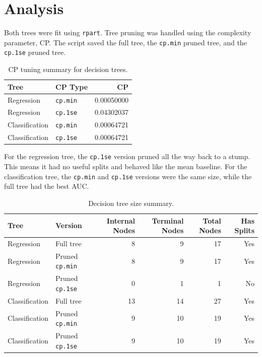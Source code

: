 \documentclass[11pt,oneside,openany]{book}
\begin{document}
\section{Analysis}

Both trees were fit using \texttt{rpart}. Tree pruning was handled using the complexity parameter, CP. The script saved the full tree, the \texttt{cp.min} pruned tree, and the \texttt{cp.1se} pruned tree.

\begin{table}[H]
\centering
\small
\caption{CP tuning summary for decision trees.}
\begin{tabular}{llr}
\toprule
Tree & CP Type & CP\\
\midrule
Regression & \texttt{cp.min} & 0.00050000\\
Regression & \texttt{cp.1se} & 0.04302037\\
Classification & \texttt{cp.min} & 0.00064721\\
Classification & \texttt{cp.1se} & 0.00064721\\
\bottomrule
\end{tabular}
\end{table}

For the regression tree, the \texttt{cp.1se} version pruned all the way back to a stump. This means it had no useful splits and behaved like the mean baseline. For the classification tree, the \texttt{cp.min} and \texttt{cp.1se} versions were the same size, while the full tree had the best AUC.

\begin{table}[H]
\centering
\small
\caption{Decision tree size summary.}
\begin{tabular}{llrrrr}
\toprule
Tree & Version & Internal Nodes & Terminal Nodes & Total Nodes & Has Splits\\
\midrule
Regression & Full tree & 8 & 9 & 17 & Yes\\
Regression & Pruned \texttt{cp.min} & 8 & 9 & 17 & Yes\\
Regression & Pruned \texttt{cp.1se} & 0 & 1 & 1 & No\\
Classification & Full tree & 13 & 14 & 27 & Yes\\
Classification & Pruned \texttt{cp.min} & 9 & 10 & 19 & Yes\\
Classification & Pruned \texttt{cp.1se} & 9 & 10 & 19 & Yes\\
\bottomrule
\end{tabular}
\end{table}
\end{document}
